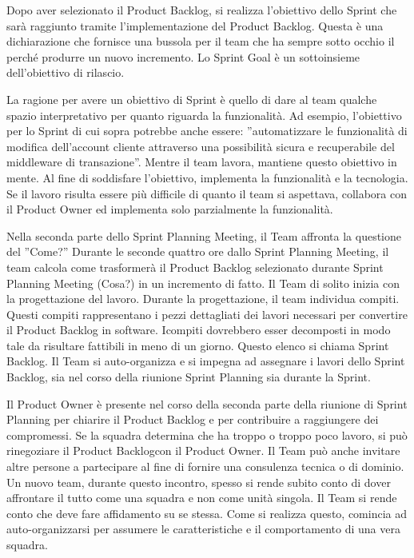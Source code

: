 Dopo aver selezionato il Product Backlog, si realizza l'obiettivo dello Sprint che sar\`a raggiunto tramite l'implementazione del Product Backlog. Questa \`e una dichiarazione che fornisce una bussola per il team che ha sempre sotto occhio il perch\'e  produrre un nuovo incremento. Lo Sprint Goal \`e un sottoinsieme dell'obiettivo di rilascio.
\newline

La ragione per avere un obiettivo di Sprint \`e quello di dare al team qualche spazio interpretativo per quanto riguarda la funzionalit\`a. Ad esempio, l'obiettivo per lo Sprint di cui sopra potrebbe anche essere: ''automatizzare le funzionalit\`a di modifica dell'account cliente attraverso una possibilit\`a sicura e recuperabile del middleware di transazione''. Mentre il team lavora, mantiene questo obiettivo in mente. Al fine di soddisfare l'obiettivo, implementa la funzionalit\`a e la tecnologia. Se il lavoro risulta essere pi\`u difficile di quanto il team si aspettava, collabora con il Product Owner ed implementa solo parzialmente la funzionalit\`a.
\newline

Nella seconda parte dello Sprint Planning Meeting, il Team affronta la questione del ''Come?'' Durante le seconde quattro ore dallo Sprint Planning Meeting, il team calcola come trasformer\`a il Product Backlog selezionato durante Sprint Planning Meeting (Cosa?) in un incremento di fatto. Il Team di solito inizia con la progettazione del lavoro. Durante la progettazione, il team individua compiti. Questi compiti rappresentano i pezzi dettagliati dei lavori necessari per convertire il Product Backlog in software. Icompiti dovrebbero esser decomposti in modo tale da risultare fattibili in meno di un giorno. Questo elenco si chiama Sprint Backlog. Il Team si auto-organizza e si impegna ad assegnare i lavori dello Sprint Backlog, sia nel corso della riunione Sprint Planning sia durante la Sprint.
\newline

Il Product Owner \`e presente nel corso della seconda parte della riunione di Sprint Planning per chiarire il Product Backlog e per contribuire a raggiungere dei compromessi. Se la squadra determina che ha troppo o troppo poco lavoro, si pu\`o rinegoziare il Product Backlogcon il Product Owner. Il Team pu\`o anche invitare altre persone a partecipare al fine di fornire una consulenza tecnica o di dominio. Un nuovo team, durante questo incontro, spesso si rende subito conto di dover affrontare il tutto come una squadra e non come unit\`a singola. Il Team si rende conto che deve fare affidamento su se stessa. Come si realizza questo, comincia ad auto-organizzarsi per assumere le caratteristiche e il comportamento di una vera squadra.


